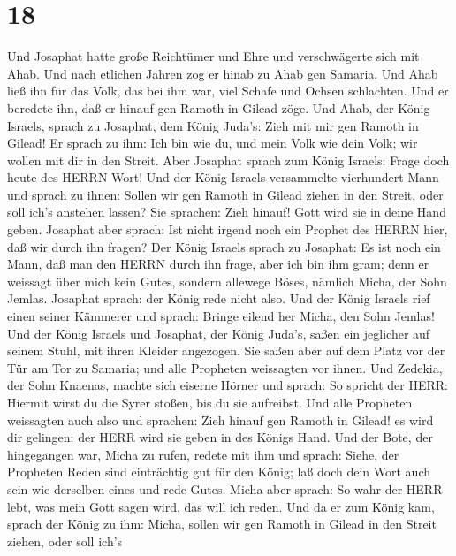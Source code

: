 \hypertarget{section-17}{%
\section{18}\label{section-17}}

 Und Josaphat hatte große Reichtümer und Ehre und
verschwägerte sich mit Ahab.  Und nach etlichen Jahren zog
er hinab zu Ahab gen Samaria. Und Ahab ließ ihn für das Volk, das bei
ihm war, viel Schafe und Ochsen schlachten. Und er beredete ihn, daß er
hinauf gen Ramoth in Gilead zöge.  Und Ahab, der König
Israels, sprach zu Josaphat, dem König Juda's: Zieh mit mir gen Ramoth
in Gilead! Er sprach zu ihm: Ich bin wie du, und mein Volk wie dein
Volk; wir wollen mit dir in den Streit.  Aber Josaphat
sprach zum König Israels: Frage doch heute des HERRN Wort! 
Und der König Israels versammelte vierhundert Mann und sprach zu ihnen:
Sollen wir gen Ramoth in Gilead ziehen in den Streit, oder soll ich's
anstehen lassen? Sie sprachen: Zieh hinauf! Gott wird sie in deine Hand
geben.  Josaphat aber sprach: Ist nicht irgend noch ein
Prophet des HERRN hier, daß wir durch ihn fragen?  Der König
Israels sprach zu Josaphat: Es ist noch ein Mann, daß man den HERRN
durch ihn frage, aber ich bin ihm gram; denn er weissagt über mich kein
Gutes, sondern allewege Böses, nämlich Micha, der Sohn Jemlas. Josaphat
sprach: der König rede nicht also.  Und der König Israels
rief einen seiner Kämmerer und sprach: Bringe eilend her Micha, den Sohn
Jemlas!  Und der König Israels und Josaphat, der König
Juda's, saßen ein jeglicher auf seinem Stuhl, mit ihren Kleider
angezogen. Sie saßen aber auf dem Platz vor der Tür am Tor zu Samaria;
und alle Propheten weissagten vor ihnen.  Und Zedekia, der
Sohn Knaenas, machte sich eiserne Hörner und sprach: So spricht der
HERR: Hiermit wirst du die Syrer stoßen, bis du sie aufreibst.
 Und alle Propheten weissagten auch also und sprachen: Zieh
hinauf gen Ramoth in Gilead! es wird dir gelingen; der HERR wird sie
geben in des Königs Hand.  Und der Bote, der hingegangen
war, Micha zu rufen, redete mit ihm und sprach: Siehe, der Propheten
Reden sind einträchtig gut für den König; laß doch dein Wort auch sein
wie derselben eines und rede Gutes.  Micha aber sprach: So
wahr der HERR lebt, was mein Gott sagen wird, das will ich reden.
 Und da er zum König kam, sprach der König zu ihm: Micha,
sollen wir gen Ramoth in Gilead in den Streit ziehen, oder soll ich's
